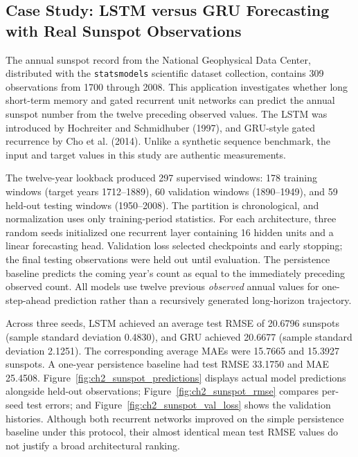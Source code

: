 \subsection{Case Study: LSTM versus GRU Forecasting with Real Sunspot Observations}
\label{sec:ch2_sunspot_forecast}
The annual sunspot record from the National Geophysical Data Center, distributed with the \texttt{statsmodels} scientific dataset collection, contains 309 observations from 1700 through 2008. This application investigates whether long short-term memory and gated recurrent unit networks can predict the annual sunspot number from the twelve preceding observed values. The LSTM was introduced by Hochreiter and Schmidhuber (1997), and GRU-style gated recurrence by Cho et al. (2014). Unlike a synthetic sequence benchmark, the input and target values in this study are authentic measurements.

The twelve-year lookback produced 297 supervised windows: 178 training windows (target years 1712--1889), 60 validation windows (1890--1949), and 59 held-out testing windows (1950--2008). The partition is chronological, and normalization uses only training-period statistics. For each architecture, three random seeds initialized one recurrent layer containing 16 hidden units and a linear forecasting head. Validation loss selected checkpoints and early stopping; the final testing observations were held out until evaluation. The persistence baseline predicts the coming year's count as equal to the immediately preceding observed count. All models use twelve previous \emph{observed} annual values for one-step-ahead prediction rather than a recursively generated long-horizon trajectory.

Across three seeds, LSTM achieved an average test RMSE of 20.6796 sunspots (sample standard deviation 0.4830), and GRU achieved 20.6677 (sample standard deviation 2.1251). The corresponding average MAEs were 15.7665 and 15.3927 sunspots. A one-year persistence baseline had test RMSE 33.1750 and MAE 25.4508. Figure~\ref{fig:ch2_sunspot_predictions} displays actual model predictions alongside held-out observations; Figure~\ref{fig:ch2_sunspot_rmse} compares per-seed test errors; and Figure~\ref{fig:ch2_sunspot_val_loss} shows the validation histories. Although both recurrent networks improved on the simple persistence baseline under this protocol, their almost identical mean test RMSE values do not justify a broad architectural ranking.

